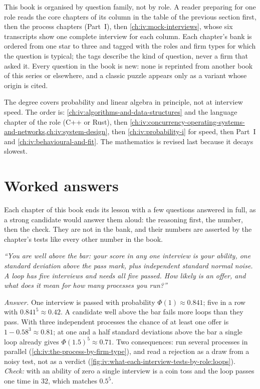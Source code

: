 This book is organised by question family, not by role. A reader preparing for one role reads the core
chapters of its column in the table of the previous section first, then the process
chapters (Part~I), then \cref{ch:iv:mock-interviews}, whose six transcripts show one complete interview for
each column. Each chapter's bank is ordered from one star to three and tagged with the roles and firm types
for which the question is typical; the tags describe the kind of question, never a firm that asked it. Every
question in the book is new: none is reprinted from another book of this series or elsewhere, and a classic
puzzle appears only as a variant whose origin is cited.

\begin{example}\label{ex:iv:what-each-interview-tests-by-role:order}
The degree covers probability and linear algebra in principle, not at interview speed. The order is:
\cref{ch:iv:algorithms-and-data-structures} and the language chapter of the role (C++ or Rust), then
\cref{ch:iv:concurrency-operating-systems-and-networks,ch:iv:system-design}, then
\cref{ch:iv:probability-i} for speed, then Part~I and \cref{ch:iv:behavioural-and-fit}. The mathematics is
revised last because it decays slowest.
\end{example}

\section{Worked answers}

Each chapter of this book ends its lesson with a few questions answered in full, as a strong candidate would answer them
aloud: the reasoning first, the number, then the check. They are not in the bank, and their numbers are asserted by the
chapter's tests like every other number in the book.

\begin{example}\label{ex:iv:what-each-interview-tests-by-role:several}
\emph{``You are well above the bar: your score in any one interview is your ability, one standard deviation above the pass
mark, plus independent standard normal noise. A loop has five interviews and needs all five passed. How likely is an
offer, and what does it mean for how many processes you run?''}

\emph{Answer.} One interview is passed with probability $\Phi(1) \approx 0.841$; five in a row with $0.841^5 \approx 0.42$.
A candidate well above the bar fails more loops than they pass. With three independent processes the chance of at least
one offer is $1 - 0.58^3 \approx 0.81$; at one and a half standard deviations above the bar a single loop already gives
$\Phi(1.5)^5 \approx 0.71$. Two consequences: run several processes in parallel (\cref{ch:iv:the-process-by-firm-type}),
and read a rejection as a draw from a noisy test, not as a verdict
(\cref{fig:iv:what-each-interview-tests-by-role:loops}). \emph{Check:} with an ability of zero a single
interview is a coin toss and the loop passes one time in 32, which matches $0.5^5$.
\end{example}

